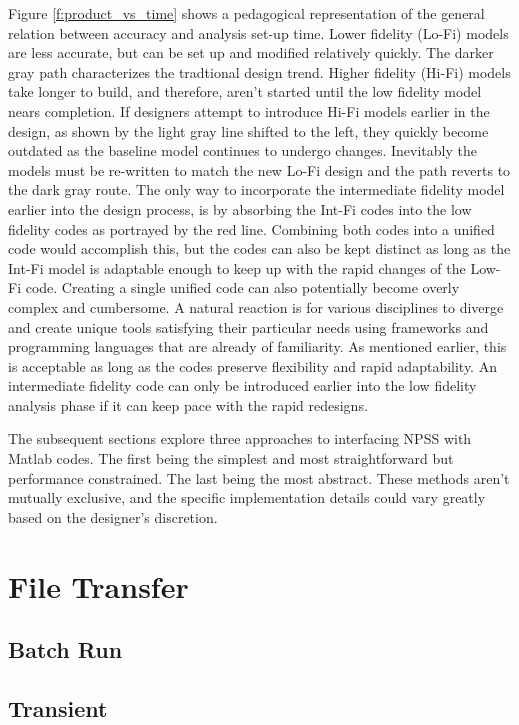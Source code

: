 \documentclass[heading.tex]{subfiles}
\begin{document}
Figure \ref{f:product_vs_time} shows a pedagogical representation of the general relation between accuracy and analysis set-up time. Lower fidelity (Lo-Fi) models are less accurate, but can be set up and modified relatively quickly. The darker gray path characterizes the tradtional design trend. Higher fidelity (Hi-Fi) models take longer to build, and therefore, aren't started until the low fidelity model nears completion. If designers attempt to introduce Hi-Fi models earlier in the design, as shown by the light gray line shifted to the left, they quickly become outdated as the baseline model continues to undergo changes. Inevitably the models must be re-written to match the new Lo-Fi design and the path reverts to the dark gray route. The only way to incorporate the intermediate fidelity model earlier into the design process, is by absorbing the Int-Fi codes into the low fidelity codes as portrayed by the red line. Combining both codes into a unified code would accomplish this, but the codes can also be kept distinct as long as the Int-Fi model is adaptable enough to keep up with the rapid changes of the Low-Fi code. Creating a single unified code can also potentially become overly complex and cumbersome. A natural reaction is for various disciplines to diverge and create unique tools satisfying their particular needs using frameworks and programming languages that are already of familiarity. As mentioned earlier, this is acceptable as long as the codes preserve flexibility and rapid adaptability. An intermediate fidelity code can only be introduced earlier into the low fidelity analysis phase if it can keep pace with the rapid redesigns.

The subsequent sections explore three approaches to interfacing NPSS with Matlab codes. The first being the simplest and most straightforward but performance constrained. The last being the most abstract. These methods aren't mutually exclusive, and the specific implementation details could vary greatly based on the designer's discretion.

\section{File Transfer}
\subsection{Batch Run}
\subsection{Transient}
\end{document}
